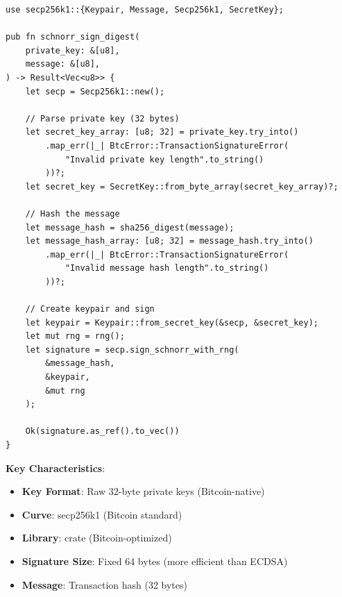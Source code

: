 \begin{listing}[htbp]
\caption{Schnorr signature creation ()}
\label{lst:ch08-schnorr-sign}
\begin{verbatim}
use secp256k1::{Keypair, Message, Secp256k1, SecretKey};

pub fn schnorr_sign_digest(
    private_key: &[u8],
    message: &[u8],
) -> Result<Vec<u8>> {
    let secp = Secp256k1::new();

    // Parse private key (32 bytes)
    let secret_key_array: [u8; 32] = private_key.try_into()
        .map_err(|_| BtcError::TransactionSignatureError(
            "Invalid private key length".to_string()
        ))?;
    let secret_key = SecretKey::from_byte_array(secret_key_array)?;

    // Hash the message
    let message_hash = sha256_digest(message);
    let message_hash_array: [u8; 32] = message_hash.try_into()
        .map_err(|_| BtcError::TransactionSignatureError(
            "Invalid message hash length".to_string()
        ))?;

    // Create keypair and sign
    let keypair = Keypair::from_secret_key(&secp, &secret_key);
    let mut rng = rng();
    let signature = secp.sign_schnorr_with_rng(
        &message_hash,
        &keypair,
        &mut rng
    );

    Ok(signature.as_ref().to_vec())
}
\end{verbatim}
\end{listing}

\textbf{Key Characteristics}:
\begin{itemize}
  \item \textbf{Key Format}: Raw 32-byte private keys (Bitcoin-native)
  \item \textbf{Curve}: secp256k1 (Bitcoin standard)
  \item \textbf{Library}:  crate (Bitcoin-optimized)
  \item \textbf{Signature Size}: Fixed 64 bytes (more efficient than ECDSA)
  \item \textbf{Message}: Transaction hash (32 bytes)
\end{itemize}

